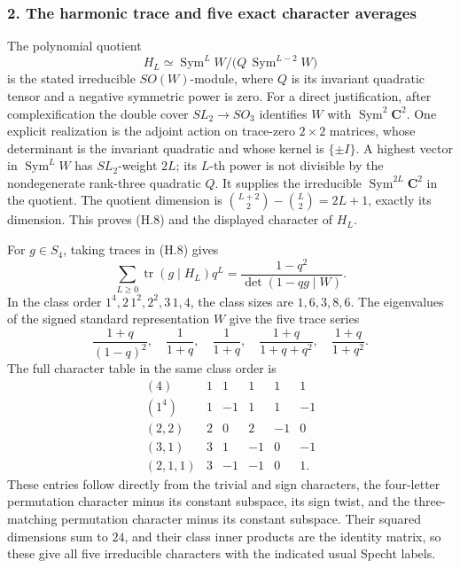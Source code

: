 \documentclass[
  10pt,
]{article}
\begin{document}
\subsubsection{2. The harmonic trace and five exact character
averages}\label{the-harmonic-trace-and-five-exact-character-averages}

The polynomial quotient \[
H_L\simeq
\operatorname{Sym}^L W/
\bigl(Q\,\operatorname{Sym}^{L-2}W\bigr)
\tag{H.8}
\] is the stated irreducible \(SO(W)\)-module, where \(Q\) is its
invariant quadratic tensor and a negative symmetric power is zero. For a
direct justification, after complexification the double cover
\(SL_2\to SO_3\) identifies \(W\) with
\(\operatorname{Sym}^2\mathbf C^2\). One explicit realization is the
adjoint action on trace-zero \(2\times2\) matrices, whose determinant is
the invariant quadratic and whose kernel is \(\{\pm I\}\). A highest
vector in \(\operatorname{Sym}^L W\) has \(SL_2\)-weight \(2L\); its
\(L\)-th power is not divisible by the nondegenerate rank-three
quadratic \(Q\). It supplies the irreducible
\(\operatorname{Sym}^{2L}\mathbf C^2\) in the quotient. The quotient
dimension is \(\binom{L+2}{2}-\binom{L}{2}=2L+1\), exactly its
dimension. This proves (H.8) and the displayed character of \(H_L\).

For \(g\in S_4\), taking traces in (H.8) gives \[
\sum_{L\ge0}\operatorname{tr}(g\mid H_L)q^L
=\frac{1-q^2}{\det(1-qg\mid W)}.
\tag{H.9}
\] In the class order \(1^4,2\,1^2,2^2,3\,1,4\), the class sizes are
\(1,6,3,8,6\). The eigenvalues of the signed standard representation
\(W\) give the five trace series \[
\frac{1+q}{(1-q)^2},\quad
\frac1{1+q},\quad
\frac1{1+q},\quad
\frac{1+q}{1+q+q^2},\quad
\frac{1+q}{1+q^2}.
\tag{H.10}
\] The full character table in the same class order is \[
\begin{array}{c|rrrrr}
(4)&1&1&1&1&1\\
(1^4)&1&-1&1&1&-1\\
(2,2)&2&0&2&-1&0\\
(3,1)&3&1&-1&0&-1\\
(2,1,1)&3&-1&-1&0&1.
\end{array}
\tag{H.11}
\] These entries follow directly from the trivial and sign characters,
the four-letter permutation character minus its constant subspace, its
sign twist, and the three-matching permutation character minus its
constant subspace. Their squared dimensions sum to \(24\), and their
class inner products are the identity matrix, so these give all five
irreducible characters with the indicated usual Specht labels.
\end{document}

